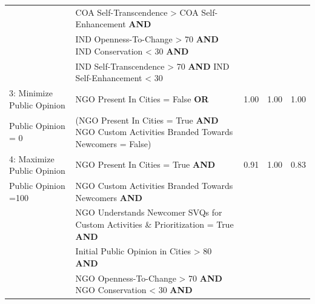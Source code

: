 \documentclass{scspaperproc}
\theoremstyle{scsthe}
\begin{document}
\begin{table}[ht]
\begin{center}
{\begin{tabular}{|l l l l l |}
                                                                      & COA Self-Transcendence > COA Self-Enhancement \textbf{AND} & & & \\ 
                                                                      & IND Openness-To-Change > 70 \textbf{AND} IND Conservation < 30 \textbf{AND} & & & \\         
                                                                      & IND Self-Transcendence > 70 \textbf{AND} IND Self-Enhancement < 30 & & & \\ 
 \hline
3: Minimize Public Opinion                                                                                       &     NGO Present In Cities  = False  \textbf{OR}   & 1.00 & 1.00 & 1.00   \\
\hspace*{0.25 cm} Public Opinion = 0 & (NGO Present In Cities  = True \textbf{AND} NGO Custom Activities Branded Towards Newcomers = False) & & & \\
\hline
4: Maximize Public Opinion                                                                                       &     NGO Present In Cities  = True  \textbf{AND}   & 0.91 & 1.00 & 0.83   \\
\hspace*{0.25cm} Public Opinion =100 & NGO Custom Activities Branded Towards Newcomers \textbf{AND} & & & \\
                                                                      & NGO Understands Newcomer SVQs for Custom Activities \& Prioritization = True \textbf{AND} & &  & \\
                                                                      & Initial Public Opinion in Cities > 80 \textbf{AND} & & & \\  
                                                                      & NGO Openness-To-Change > 70 \textbf{AND}  NGO Conservation < 30 \textbf{AND} & & & \\         

\end{tabular}}
\end{center}
\end{table}
\end{document}
